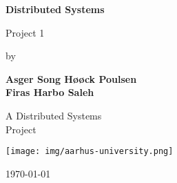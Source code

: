 \newcommand{\norm}[1]{\left\lVert#1\right\rVert}     
\newcommand\course{Distributed Systems}        %
\newcommand\hwnumber{1}                                   %
\newcommand\Information{XXX/xxxxxxxx}                     %
\begin{titlepage}
    \begin{center}
        \vspace*{3cm}
            
        \Huge
        \textbf{\course{}}
            
        \vspace{1cm}
        \huge
        Project \hwnumber
            
        \vspace{1.5cm}
        \Large
        by
        
        \textbf{Asger Song Høøck Poulsen} \\%
        \textbf{Firas Harbo Saleh} %
        
            
        \vfill
        
        A \course{} \\Project
            
        \vspace{0.5cm}
            
        \texttt{[image: img/aarhus-university.png]}
        \\
        
        \Large
        
        \today
            
    \end{center}
\end{titlepage}

